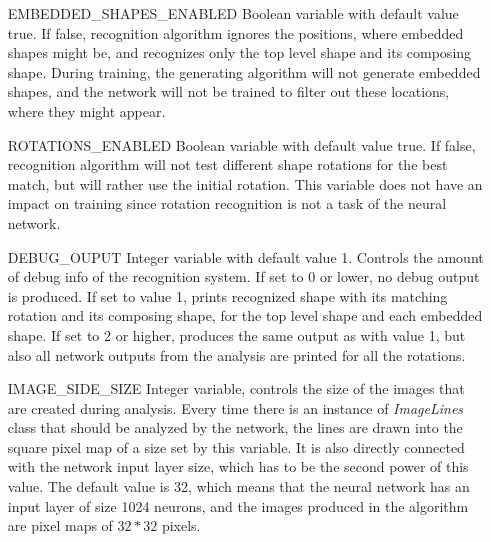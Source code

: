 \begin{description}
\begin{enumerate}
\item [EMBEDDED\_SHAPES\_ENABLED] Boolean variable with default value true. If false, recognition algorithm ignores the positions, where embedded shapes might be, and recognizes only the top level shape and its composing shape. During training, the generating algorithm will not generate embedded shapes, and the network will not be trained to filter out these locations, where they might appear.

\item [ROTATIONS\_ENABLED] Boolean variable with default value true. If false, recognition algorithm will not test different shape rotations for the best match, but will rather use the initial rotation. This variable does not have an impact on training since rotation recognition is not a task of the neural network.

\item [DEBUG\_OUPUT] Integer variable with default value 1. Controls the amount of debug info of the recognition system. If set to 0 or lower, no debug output is produced. If set to value 1, prints recognized shape with its matching rotation and its composing shape, for the top level shape and each embedded shape. If set to 2 or higher, produces the same output as with value 1, but also all network outputs from the analysis are printed for all the rotations.

\item [IMAGE\_SIDE\_SIZE] Integer variable, controls the size of the images that are created during analysis. Every time there is an instance of \emph{ImageLines} class that should be analyzed by the network, the lines are drawn into the square pixel map of a size set by this variable. It is also directly connected with the network input layer size, which has to be the second power of this value. The default value is 32, which means that the neural network has an input layer of size 1024 neurons, and the images produced in the algorithm are pixel maps of $32*32$ pixels.

\end{enumerate}


\end{description}
